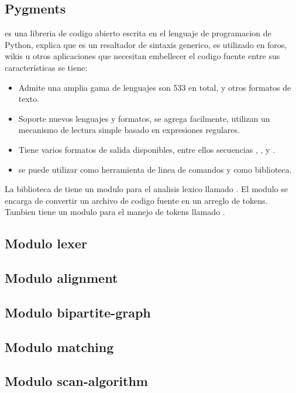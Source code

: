 \subsection{Pygments}
 es una libreria de codigo abierto escrita en el lenguaje de programacion de Python, \cite{brandl2022} explica que  es un resaltador de sintaxis generico, es utilizado en foros, wikis u otros aplicaciones que necesitan embellecer el codigo fuente entre sus características se tiene:
\begin{itemize}
  \item Admite una amplia gama de lenguajes son 533 en total, y otros formatos de texto.
  \item Soporte nuevos lenguajes y formatos, se agrega facilmente, utilizan un mecanismo de lectura simple basado en expresiones regulares.
  \item Tiene varios formatos de salida disponibles, entre ellos secuencias , ,  y .
  \item se puede utilizar como herramienta de linea de comandos y como biblioteca.
\end{itemize}
La biblioteca de  tiene un modulo para el analisis lexico llamado . El modulo se encarga de convertir un archivo de codigo fuente en un arreglo de tokens. Tambien tiene un modulo para el manejo de tokens llamado .
\subsection{Modulo lexer}

\subsection{Modulo alignment}

\subsection{Modulo bipartite-graph}

\subsection{Modulo matching}

\subsection{Modulo scan-algorithm}

